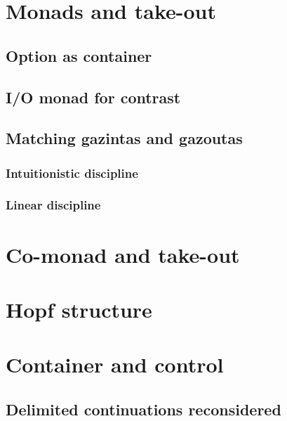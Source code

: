 \section{Monads and take-out}

\subsection{Option as container}

\subsection{I/O monad for contrast}

\subsection{Matching gazintas and gazoutas}

\subsubsection{Intuitionistic discipline}

\subsubsection{Linear discipline}

\section{Co-monad and take-out}

\section{Hopf structure}

\section{Container and control}

\subsection{Delimited continuations reconsidered}